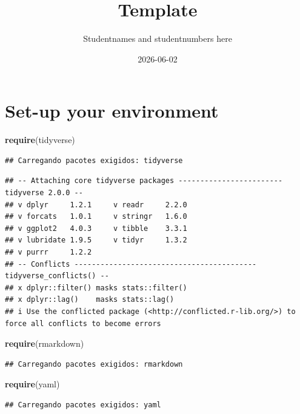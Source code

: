 \documentclass[
]{article}
\title{Template}
\author{Studentnames and studentnumbers here}
\date{2026-06-02}
\newenvironment{Shaded}{\begin{snugshade}}{\end{snugshade}}
\newcommand{\FunctionTok}[1]{\textcolor[rgb]{0.13,0.29,0.53}{\textbf{#1}}}
\newcommand{\NormalTok}[1]{#1}
\begin{document}
\maketitle

\section{Set-up your environment}\label{set-up-your-environment}

\begin{Shaded}
\begin{Highlighting}[]
\FunctionTok{require}\NormalTok{(tidyverse)}
\end{Highlighting}
\end{Shaded}

\begin{verbatim}
## Carregando pacotes exigidos: tidyverse
\end{verbatim}

\begin{verbatim}
## -- Attaching core tidyverse packages ------------------------ tidyverse 2.0.0 --
## v dplyr     1.2.1     v readr     2.2.0
## v forcats   1.0.1     v stringr   1.6.0
## v ggplot2   4.0.3     v tibble    3.3.1
## v lubridate 1.9.5     v tidyr     1.3.2
## v purrr     1.2.2     
## -- Conflicts ------------------------------------------ tidyverse_conflicts() --
## x dplyr::filter() masks stats::filter()
## x dplyr::lag()    masks stats::lag()
## i Use the conflicted package (<http://conflicted.r-lib.org/>) to force all conflicts to become errors
\end{verbatim}

\begin{Shaded}
\begin{Highlighting}[]
\FunctionTok{require}\NormalTok{(rmarkdown)}
\end{Highlighting}
\end{Shaded}

\begin{verbatim}
## Carregando pacotes exigidos: rmarkdown
\end{verbatim}

\begin{Shaded}
\begin{Highlighting}[]
\FunctionTok{require}\NormalTok{(yaml)}
\end{Highlighting}
\end{Shaded}

\begin{verbatim}
## Carregando pacotes exigidos: yaml
\end{verbatim}
\end{document}
